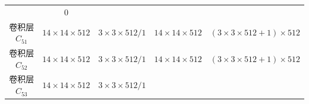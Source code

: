 \begin{longtable}[]{ ccccc }
\begin{minipage}[t]{0.16\columnwidth}
\end{minipage} & \begin{minipage}[t]{0.22\columnwidth}\centering\strut
\(0\)\strut
\end{minipage}\tabularnewline
\begin{minipage}[t]{0.16\columnwidth}\centering\strut
卷积层\(C_{51}\)\strut
\end{minipage} & \begin{minipage}[t]{0.15\columnwidth}\centering\strut
\(14\times14\times512\)\strut
\end{minipage} & \begin{minipage}[t]{0.17\columnwidth}\centering\strut
\(3\times3\times512/1\)\strut
\end{minipage} & \begin{minipage}[t]{0.16\columnwidth}\centering\strut
\(14\times14\times512\)\strut
\end{minipage} & \begin{minipage}[t]{0.22\columnwidth}\centering\strut
\((3\times3\times512+1)\times512\)\strut
\end{minipage}\tabularnewline
\begin{minipage}[t]{0.16\columnwidth}\centering\strut
卷积层\(C_{52}\)\strut
\end{minipage} & \begin{minipage}[t]{0.15\columnwidth}\centering\strut
\(14\times14\times512\)\strut
\end{minipage} & \begin{minipage}[t]{0.17\columnwidth}\centering\strut
\(3\times3\times512/1\)\strut
\end{minipage} & \begin{minipage}[t]{0.16\columnwidth}\centering\strut
\(14\times14\times512\)\strut
\end{minipage} & \begin{minipage}[t]{0.22\columnwidth}\centering\strut
\((3\times3\times512+1)\times512\)\strut
\end{minipage}\tabularnewline
\begin{minipage}[t]{0.16\columnwidth}\centering\strut
卷积层\(C_{53}\)\strut
\end{minipage} & \begin{minipage}[t]{0.15\columnwidth}\centering\strut
\(14\times14\times512\)\strut
\end{minipage} & \begin{minipage}[t]{0.17\columnwidth}\centering\strut
\(3\times3\times512/1\)\strut
\end{minipage} & \begin{minipage}[t]{0.16\columnwidth}\centering\strut

\end{minipage}
\end{longtable}
